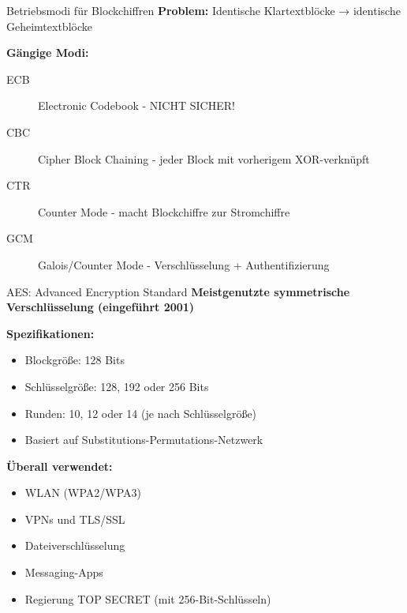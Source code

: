 \documentclass[handout]{beamer}
\begin{document}
\begin{frame}{Betriebsmodi für Blockchiffren}
\textbf{Problem:} Identische Klartextblöcke → identische Geheimtextblöcke

\vspace{0.3cm}
\textbf{Gängige Modi:}
\begin{description}
    \item[ECB] Electronic Codebook - \alert{NICHT SICHER!}
    \item[CBC] Cipher Block Chaining - jeder Block mit vorherigem XOR-verknüpft
    \item[CTR] Counter Mode - macht Blockchiffre zur Stromchiffre
    \item[GCM] Galois/Counter Mode - Verschlüsselung + Authentifizierung
\end{description}

\end{frame}

\begin{frame}{AES: Advanced Encryption Standard}
\textbf{Meistgenutzte symmetrische Verschlüsselung (eingeführt 2001)}

\vspace{0.3cm}
\textbf{Spezifikationen:}
\begin{itemize}
    \item Blockgröße: 128 Bits
    \item Schlüsselgröße: 128, 192 oder 256 Bits
    \item Runden: 10, 12 oder 14 (je nach Schlüsselgröße)
    \item Basiert auf Substitutions-Permutations-Netzwerk
\end{itemize}

\vspace{0.3cm}
\textbf{Überall verwendet:}
\begin{itemize}
    \item WLAN (WPA2/WPA3)
    \item VPNs und TLS/SSL
    \item Dateiverschlüsselung
    \item Messaging-Apps
    \item Regierung TOP SECRET (mit 256-Bit-Schlüsseln)
\end{itemize}

\end{frame}
\end{document}
